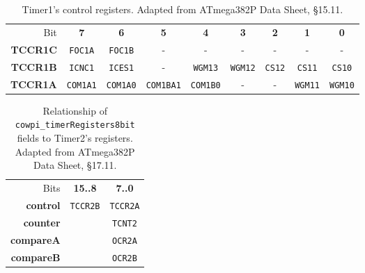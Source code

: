\begin{table}[p]
    \centering \small
    \begin{tabular}{|r||c|c|c|c|c|c|c|c||}
        \hline
        Bit             & \textbf{7}        & \textbf{6}        & \textbf{5}        & \textbf{4}        & \textbf{3}        & \textbf{2}    & \textbf{1}        & \textbf{0}        \\ \cline{2-9}
        \textbf{TCCR1C} & \texttt{FOC1A}    & \texttt{FOC1B}    & -                 & -                 & -                 & -             & -                 & -                 \\
        \textbf{TCCR1B} & \texttt{ICNC1}    & \texttt{ICES1}    & -                 & \texttt{WGM13}    & \texttt{WGM12}    & \texttt{CS12} & \texttt{CS11}     & \texttt{CS10}     \\
        \textbf{TCCR1A} & \texttt{COM1A1}   & \texttt{COM1A0}   & \texttt{COM1BA1}  & \texttt{COM1B0}   & -                 & -             & \texttt{WGM11}    & \texttt{WGM10}    \\ \hline
    \end{tabular}
    \caption{Timer1's control registers. \tiny Adapted from ATmega382P Data Sheet, §15.11. \label{table:Timer1Control}}
\end{table}

\begin{table}[p]
    \centering \small
    \begin{tabular}{|r||c|c||}
        \hline
        Bits                & \textbf{15..8}    & \textbf{7..0}     \\ \cline{2-3}
        \textbf{control}    & \texttt{TCCR2B}   & \texttt{TCCR2A}   \\
        \textbf{counter}    &                   & \texttt{TCNT2}    \\
        \textbf{compareA}   &                   & \texttt{OCR2A}    \\
        \textbf{compareB}   &                   & \texttt{OCR2B}    \\ \hline
    \end{tabular}
    \caption{Relationship of \lstinline{cowpi_timerRegisters8bit} fields to Timer2's registers. \tiny Adapted from ATmega382P Data Sheet, §17.11. \label{table:Timer2Registers}}
\end{table}

